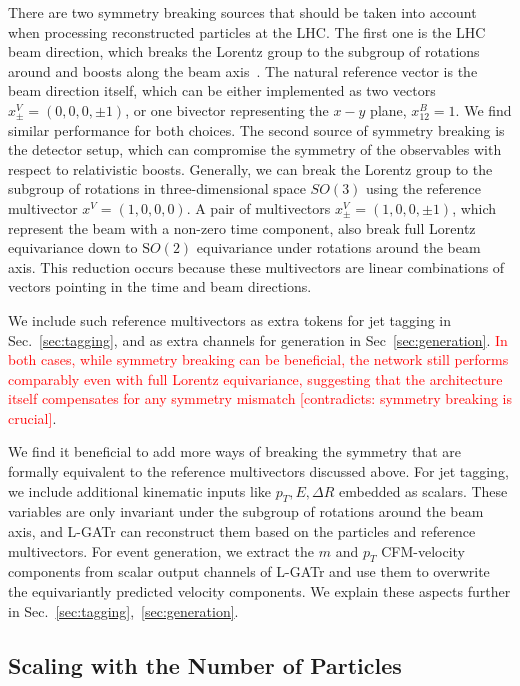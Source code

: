 \documentclass[submission, Phys]{SciPost}
\begin{document}
There are two symmetry breaking sources that should be taken into account when processing reconstructed particles at the LHC. The first one is the LHC beam direction, which breaks the Lorentz group to the subgroup of rotations around and boosts along the beam axis~\cite{Maitre:2024hzp,Bogatskiy:2023nnw, ruhe2023clifford, Gong:2022lye}. The natural reference vector is the beam direction itself, which can be either implemented as two vectors $x^V_\pm = (0,0,0,\pm 1)$, or one bivector representing the $x-y$ plane, $x^B_{12} = 1$. We find similar performance for both choices. The second source of symmetry breaking is the detector setup, which can compromise the symmetry of the observables with respect to relativistic boosts. Generally, we can break the Lorentz group to the subgroup of rotations in three-dimensional space $SO(3)$ using the reference multivector $x^V = (1,0,0,0)$. A pair of multivectors $x^V_\pm = (1,0,0,\pm 1)$, which represent the beam with a non-zero time component, also break full Lorentz equivariance down to $\mathrm SO(2)$ equivariance under rotations around the beam axis. This reduction occurs because these multivectors are linear combinations of vectors pointing in the time and beam directions.

We include such reference multivectors as extra tokens for jet tagging in Sec.~\ref{sec:tagging}, and as extra channels for generation in Sec~\ref{sec:generation}. \textcolor{red}{In both cases, while symmetry breaking can be beneficial, the network still performs comparably even with full Lorentz equivariance, suggesting that the architecture itself compensates for any symmetry mismatch [contradicts: symmetry breaking is crucial]}.

We find it beneficial to add more ways of breaking the symmetry that are formally equivalent to the reference multivectors discussed above. For jet tagging, we include additional kinematic inputs like $p_T, E, \Delta R$ embedded as scalars. These variables are only invariant under the subgroup of rotations around the beam axis, and L-GATr can reconstruct them based on the particles and reference multivectors. For event generation, we extract the $m$ and $p_T$ CFM-velocity components from scalar output channels of L-GATr and use them to overwrite the equivariantly predicted velocity components. We explain these aspects further in Sec.~\ref{sec:tagging},~\ref{sec:generation}.

\subsection{Scaling with the Number of Particles}
\end{document}
